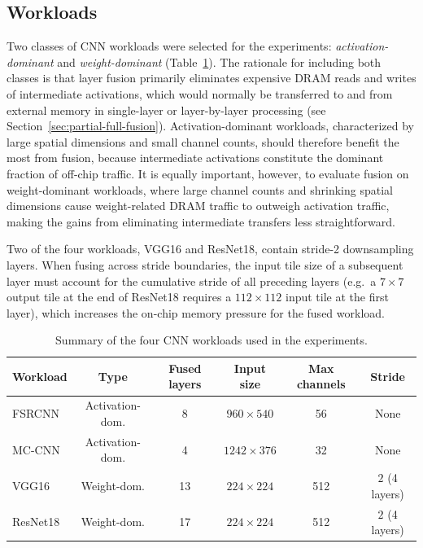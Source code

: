 \subsection{Workloads}
\label{sec:workloads}

Two classes of CNN workloads were selected for the experiments:
\emph{activation-dominant} and \emph{weight-dominant}
(Table~\ref{tab:workloads}).
The rationale for including both classes is that layer fusion
primarily eliminates expensive DRAM reads and writes of intermediate
activations, which would normally be transferred to and from external
memory in single-layer or layer-by-layer processing
(see Section~\ref{sec:partial-full-fusion}).
Activation-dominant workloads, characterized by large spatial dimensions
and small channel counts, should therefore benefit the most from fusion,
because intermediate activations constitute the dominant fraction of
off-chip traffic.
It is equally important, however, to evaluate fusion on weight-dominant
workloads, where large channel counts and shrinking spatial dimensions
cause weight-related DRAM traffic to outweigh activation traffic,
making the gains from eliminating intermediate transfers less
straightforward.

Two of the four workloads, VGG16 and ResNet18, contain stride-2
downsampling layers.
When fusing across stride boundaries, the input tile size of a
subsequent layer must account for the cumulative stride of all
preceding layers (e.g.\ a $7 \times 7$ output tile at the end of
ResNet18 requires a $112 \times 112$ input tile at the first layer),
which increases the on-chip memory pressure for the fused workload.

\begin{table}[htbp]
  \centering
  \caption{Summary of the four CNN workloads used in the experiments.}
  \label{tab:workloads}
  \small
  \begin{tabular}{l c c c c c}
    \toprule
    \textbf{Workload}
      & \textbf{Type}
      & \textbf{Fused layers}
      & \textbf{Input size}
      & \textbf{Max channels}
      & \textbf{Stride} \\
    \midrule
    FSRCNN~\cite{fsrcnn}
      & Activation-dom.
      & 8
      & $960 \times 540$
      & 56
      & None \\
    MC-CNN~\cite{mccnn}
      & Activation-dom.
      & 4
      & $1242 \times 376$
      & 32
      & None \\
    VGG16~\cite{vgg16}
      & Weight-dom.
      & 13
      & $224 \times 224$
      & 512
      & $2$ (4 layers) \\
    ResNet18~\cite{resnet18}
      & Weight-dom.
      & 17
      & $224 \times 224$
      & 512
      & $2$ (4 layers) \\
    \bottomrule
  \end{tabular}
\end{table}

